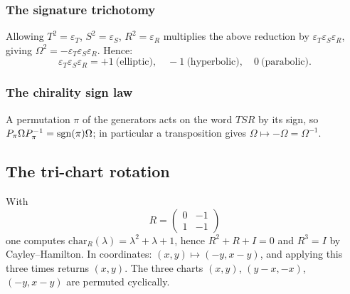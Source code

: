 \subsubsection{The signature trichotomy}
Allowing $T^{2}=\varepsilon_T$, $S^{2}=\varepsilon_S$, $R^{2}=\varepsilon_R$ multiplies the
above reduction by $\varepsilon_T\varepsilon_S\varepsilon_R$, giving
$\Omega^{2}=-\varepsilon_T\varepsilon_S\varepsilon_R$.  Hence:
\[
  \varepsilon_T\varepsilon_S\varepsilon_R=+1\ \text{(elliptic)},\quad
  -1\ \text{(hyperbolic)},\quad 0\ \text{(parabolic)} .
\]

\subsubsection{The chirality sign law}
A permutation $\pi$ of the generators acts on the word $TSR$ by its sign, so
$P_\pi\Omega P_\pi^{-1}=\operatorname{sgn}(\pi)\Omega$; in particular a transposition gives
$\Omega\mapsto-\Omega=\Omega^{-1}$.

\subsection{The tri-chart rotation}

With
\[
  R=\begin{pmatrix}0&-1\\ 1&-1\end{pmatrix}
\]
one computes $\mathrm{char}_{R}(\lambda)=\lambda^{2}+\lambda+1$, hence $R^{2}+R+I=0$ and
$R^{3}=I$ by Cayley--Hamilton.  In coordinates: $(x,y)\mapsto(-y,x-y)$, and applying this
three times returns $(x,y)$.  The three charts $(x,y)$, $(y-x,-x)$, $(-y,x-y)$ are permuted
cyclically.
